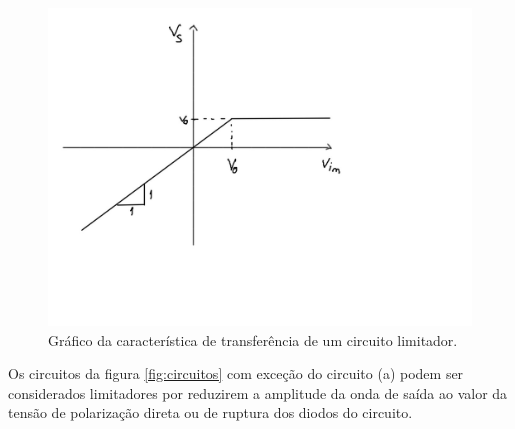 \documentclass{abntex2}
\begin{document}
\begin{figure}[h]
  \centering
  \includegraphics[width=.8\textwidth]{grafLimitador.jpg}
  \caption{Gráfico da característica de transferência de um circuito limitador.}
  \label{fig:limitador}
\end{figure}

Os circuitos da figura \ref{fig:circuitos} com exceção do circuito (a) podem ser considerados limitadores por reduzirem a amplitude da onda de saída ao valor da tensão de polarização direta ou de ruptura dos diodos do circuito.
\end{document}

